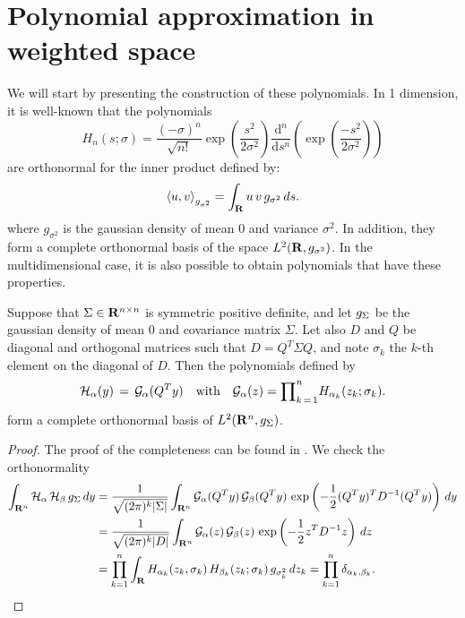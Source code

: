 \section{Polynomial approximation in weighted space}
We will start by presenting the construction of these polynomials. In 1
dimension, it is well-known that the polynomials
\begin{equation}
    H_n(s; \sigma) = \frac{(-\sigma)^n}{\sqrt{n!}}
    \exp\left({\frac{s^2}{2\sigma^2}}\right)\frac{\mathrm d ^n}{\mathrm d
    s^n}\left(\exp{\left(\frac{-s^2}{2\sigma^2}\right)}\right)
    \label{Hermite polynomials in 1 dimension}
\end{equation}
are orthonormal for the inner product defined by:
$$ \left \langle u, v \right \rangle_{g_{\sigma^2}} = \int_{\mathbf R} u \, v \, g_{\sigma^2} \, ds. $$
where $g_{\sigma^2}$ is the gaussian density of mean 0 and variance $\sigma^2$.
In addition, they form a complete orthonormal basis of the space $L^2(\mathbf R,
g_{\sigma^2})$. In the multidimensional case, it is also possible to obtain
polynomials that have these properties.
\begin{lemma}
   Suppose that $\Sigma \in \mathbf R^{n\times n}$ is symmetric positive definite,
   and let $g_{\Sigma}$ be the gaussian density of mean $0$ and covariance
   matrix $\Sigma$. Let also $D$ and $Q$ be diagonal and orthogonal matrices
   such that $D = Q^T \Sigma Q$, and note $\sigma_k$ the $k$-th element on the
   diagonal of $D$. Then the polynomials defined by
    \begin{equation}
        \mathcal H_{\alpha}(y)\,=\, \mathcal G_{\alpha} (Q^T y) \quad \text{with}
        \quad \mathcal G_\alpha(z)={\prod}_{k\,=\,1}^n H_{\alpha_k}(z_k; \sigma_k).
        \label{eq: Definition of modified Hermite polynomials}
    \end{equation}
    form a complete orthonormal basis of $L^2(\mathbf R^n, g_{\Sigma})$.
\end{lemma}
\iflong \begin{proof}
    The proof of the completeness can be found in \cite{andrews2000special}.
    We check the orthonormality
    \begin{align*}
    \int_{\mathbf R^n} \mathcal H_\alpha \, \mathcal H_\beta \, g_{\Sigma}
    \, dy &= \frac{1}{\sqrt{(2\pi)^k| \Sigma|}}\int_{\mathbf R^n}\mathcal G_\alpha
    (Q^T y) \,\mathcal G_\beta (Q^T y) \,
    \exp\left(-\frac{1}{2}(Q^Ty)^T D^{-1} (Q^Ty) \right) \, dy  \\
    &=  \frac{1}{\sqrt{(2\pi)^k| D|}}\int_{\mathbf R^n}\mathcal G_\alpha (z)
    \,\mathcal G_\beta (z) \,  \exp\left(-\frac{1}{2}z^T D^{-1}z \right) \, dz
    \\ &= \prod_{k=1}^n \int_{\mathbf R} H_{\alpha_k}(z_k,\sigma_k) \,
    H_{\beta_k}(z_k; \sigma_k) \, g_{\sigma_k^2} \, dz_k = \prod_{k=1}^n
    \delta_{\alpha_k,\beta_k}.
    \end{align*}
\end{proof} \fi
